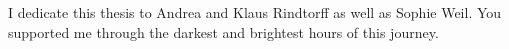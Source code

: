 
I dedicate this thesis to Andrea and Klaus Rindtorff as well as Sophie Weil. You supported me through the darkest and brightest hours of this journey.